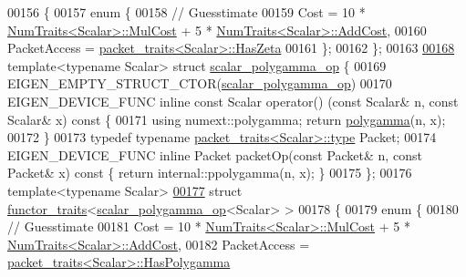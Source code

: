 \begin{DoxyCode}
00156 \{
00157     \textcolor{keyword}{enum} \{
00158         \textcolor{comment}{// Guesstimate}
00159         Cost = 10 * \hyperlink{group___core___module_struct_eigen_1_1_num_traits}{NumTraits<Scalar>::MulCost} + 5 * 
      \hyperlink{group___core___module_struct_eigen_1_1_num_traits}{NumTraits<Scalar>::AddCost},
00160         PacketAccess = \hyperlink{struct_eigen_1_1internal_1_1packet__traits}{packet\_traits<Scalar>::HasZeta}
00161     \};
00162 \};
00163 
\hyperlink{struct_eigen_1_1internal_1_1scalar__polygamma__op}{00168} \textcolor{keyword}{template}<\textcolor{keyword}{typename} Scalar> \textcolor{keyword}{struct }\hyperlink{struct_eigen_1_1internal_1_1scalar__polygamma__op}{scalar\_polygamma\_op} \{
00169     EIGEN\_EMPTY\_STRUCT\_CTOR(\hyperlink{struct_eigen_1_1internal_1_1scalar__polygamma__op}{scalar\_polygamma\_op})
00170     EIGEN\_DEVICE\_FUNC \textcolor{keyword}{inline} \textcolor{keyword}{const} Scalar operator() (\textcolor{keyword}{const} Scalar& n, \textcolor{keyword}{const} Scalar& x)\textcolor{keyword}{ const }\{
00171         \textcolor{keyword}{using} numext::polygamma; \textcolor{keywordflow}{return} \hyperlink{namespace_eigen_ae3b47a13a0699f5dbaa0623c11333dca}{polygamma}(n, x);
00172     \}
00173     \textcolor{keyword}{typedef} \textcolor{keyword}{typename} \hyperlink{struct_eigen_1_1internal_1_1packet__traits}{packet\_traits<Scalar>::type} Packet;
00174     EIGEN\_DEVICE\_FUNC \textcolor{keyword}{inline} Packet packetOp(\textcolor{keyword}{const} Packet& n, \textcolor{keyword}{const} Packet& x)\textcolor{keyword}{ const }\{ \textcolor{keywordflow}{return} 
      internal::ppolygamma(n, x); \}
00175 \};
00176 \textcolor{keyword}{template}<\textcolor{keyword}{typename} Scalar>
\hyperlink{struct_eigen_1_1internal_1_1functor__traits_3_01scalar__polygamma__op_3_01_scalar_01_4_01_4}{00177} \textcolor{keyword}{struct }\hyperlink{struct_eigen_1_1internal_1_1functor__traits}{functor\_traits}<\hyperlink{struct_eigen_1_1internal_1_1scalar__polygamma__op}{scalar\_polygamma\_op}<Scalar> >
00178 \{
00179     \textcolor{keyword}{enum} \{
00180         \textcolor{comment}{// Guesstimate}
00181         Cost = 10 * \hyperlink{group___core___module_struct_eigen_1_1_num_traits}{NumTraits<Scalar>::MulCost} + 5 * 
      \hyperlink{group___core___module_struct_eigen_1_1_num_traits}{NumTraits<Scalar>::AddCost},
00182         PacketAccess = \hyperlink{struct_eigen_1_1internal_1_1packet__traits}{packet\_traits<Scalar>::HasPolygamma}

\end{DoxyCode}
